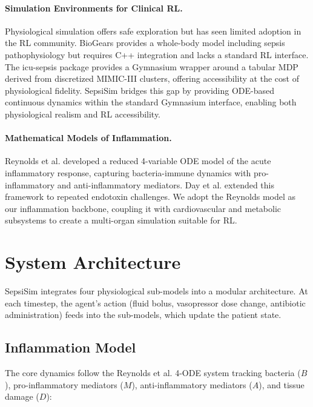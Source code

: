 \documentclass[11pt,a4paper]{article}
\begin{document}
\paragraph{Simulation Environments for Clinical RL.}
Physiological simulation offers safe exploration but has seen limited adoption in the RL community. BioGears \citep{mcdaniel2019biogears} provides a whole-body model including sepsis pathophysiology but requires C++ integration and lacks a standard RL interface. The icu-sepsis package \citep{choudhary2024icu} provides a Gymnasium wrapper around a tabular MDP derived from discretized MIMIC-III clusters, offering accessibility at the cost of physiological fidelity. SepsiSim bridges this gap by providing ODE-based continuous dynamics within the standard Gymnasium interface, enabling both physiological realism and RL accessibility.

\paragraph{Mathematical Models of Inflammation.}
Reynolds et al. \citep{reynolds2006reduced} developed a reduced 4-variable ODE model of the acute inflammatory response, capturing bacteria-immune dynamics with pro-inflammatory and anti-inflammatory mediators. Day et al. \citep{day2006reduced} extended this framework to repeated endotoxin challenges. We adopt the Reynolds model as our inflammation backbone, coupling it with cardiovascular and metabolic subsystems to create a multi-organ simulation suitable for RL.

\section{System Architecture}

SepsiSim integrates four physiological sub-models into a modular architecture. At each timestep, the agent's action (fluid bolus, vasopressor dose change, antibiotic administration) feeds into the sub-models, which update the patient state.

\subsection{Inflammation Model}

The core dynamics follow the Reynolds et al. \citep{reynolds2006reduced} 4-ODE system tracking bacteria ($B$), pro-inflammatory mediators ($M$), anti-inflammatory mediators ($A$), and tissue damage ($D$):
\end{document}

